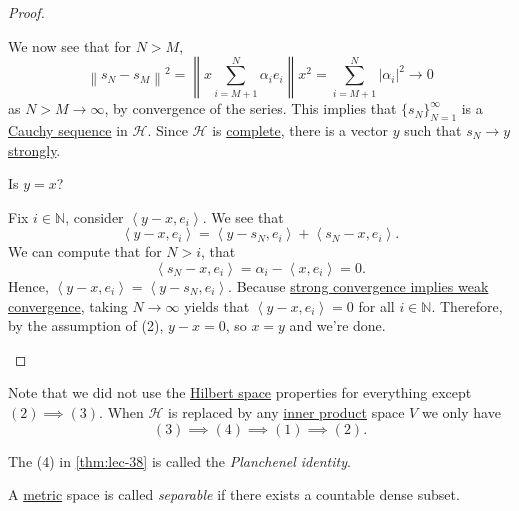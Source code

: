 \begin{proof}
\begin{explanation}
		We now see that for \(N > M\),
		\[
			\left\lVert s_N - s_M\right\rVert^2 = \left\lVert x \sum_{i=M + 1}^N \alpha_i e_i\right\rVert x ^2 = \sum_{i=M+1}^N \left\vert \alpha_i \right\vert ^2 \to 0
		\]
		as \(N > M \to \infty\), by convergence of the series. This implies that \(\{s_N\}_{N=1}^\infty\) is a \hyperref[def:Cauchy-sequence]{Cauchy sequence} in \(\mathcal{H}\).
		Since \(\mathcal{H}\) is \hyperref[def:complete]{complete}, there is a vector \(y\) such that \hyperref[def:strong-convergence]{\(s_N \to y\) strongly}.
		\begin{problem}
		Is \(y = x\)?
		\end{problem}
		\begin{answer}
			Fix \(i \in \mathbb{N}\), consider \(\left< y-x, e_i \right>\). We see that
			\[
				\left< y-x,e_i \right> = \left< y-s_N,e_i \right> + \left< s_N - x, e_i \right>.
			\]
			We can compute that for \(N > i\), that
			\[
				\left< s_N - x, e_i \right> = \alpha_i - \left< x,e_i \right>  = 0.
			\]
			Hence, \(\left< y -x,e_i \right> = \left< y-s_N,e_i \right>\). Because \hyperref[lma:strong-convergence-implies-weak-convergence]{strong convergence implies weak convergence},
			taking \(N \to \infty\) yields that \(\left< y-x,e_i \right> = 0\) for all \(i \in \mathbb{N}\). Therefore, by the assumption of (2), \(y -x = 0\), so \(x = y\) and we're done.
		\end{answer}
	\end{explanation}
\end{proof}
\begin{remark}
	Note that we did not use the \hyperref[def:Hilbert-space]{Hilbert space} properties for everything except \((2)\implies(3)\).
	When \(\mathcal{H}\) is replaced by any \hyperref[def:inner-product]{inner product} space \(V\) we only have
	\[
		(3) \implies (4) \implies (1) \implies (2).
	\]
\end{remark}
\begin{note}\label{note:Planchenel-identity}
	The (4) in \autoref{thm:lec-38} is called the \emph{Planchenel identity}.
\end{note}

\begin{definition}[Separable]\label{def:separable}
	A \hyperref[def:metric]{metric} space is called \emph{separable} if there exists a countable dense subset.
\end{definition}

